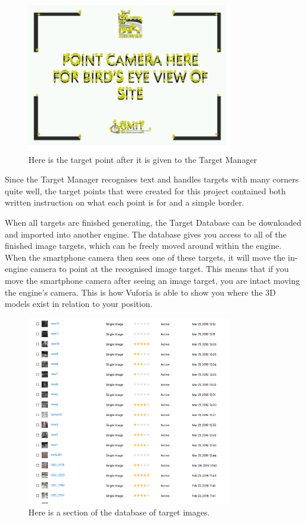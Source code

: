 \clearpage
\begin{figure}[ht!]
	\centering
	\includegraphics[width=90mm]{points}
	\caption{Here is the target point after it is given to the Target Manager \label{overflow}}
\end{figure}


Since the Target Manager recognises text and handles targets with many corners quite well, the target points that were created for this project contained both written instruction on what each point is for and a simple border. 

When all targets are finished generating, the Target Database can be downloaded and imported into another engine. The database gives you access to all of the finished image targets, which can be freely moved around within the engine. When the smartphone camera then sees one of these targets, it will move the in-engine camera to point at the recognised image target. This means that if you move the smartphone camera after seeing an image target, you are intact moving the engine’s camera. This is how Vuforia is able to show you where the 3D models exist in relation to your position.

\begin{figure}[ht!]
	\centering
	\includegraphics[width=90mm]{database}
	\caption{Here is a section of the database of target images. \label{overflow}}
\end{figure}


